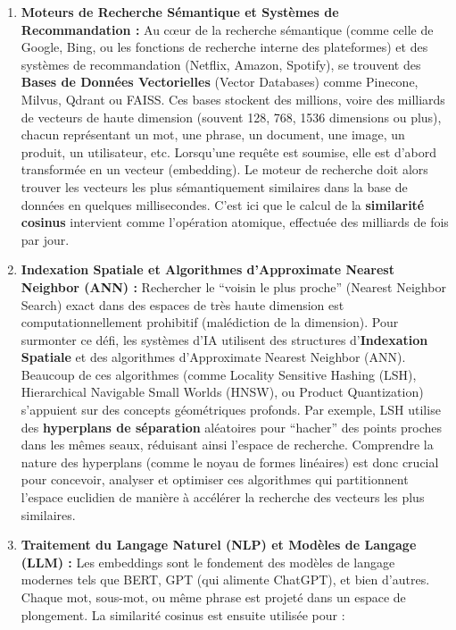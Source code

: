 \documentclass[11pt,a4paper]{report}
\begin{document}
\begin{itemize}
  \begin{enumerate}
  \def\labelenumi{\arabic{enumi}.}
  \item
    \textbf{Moteurs de Recherche Sémantique et Systèmes de
    Recommandation :} Au cœur de la recherche sémantique (comme celle de
    Google, Bing, ou les fonctions de recherche interne des plateformes)
    et des systèmes de recommandation (Netflix, Amazon, Spotify), se
    trouvent des \textbf{Bases de Données Vectorielles} (Vector
    Databases) comme Pinecone, Milvus, Qdrant ou FAISS. Ces bases
    stockent des millions, voire des milliards de vecteurs de haute
    dimension (souvent 128, 768, 1536 dimensions ou plus), chacun
    représentant un mot, une phrase, un document, une image, un produit,
    un utilisateur, etc. Lorsqu'une requête est soumise, elle est
    d'abord transformée en un vecteur (embedding). Le moteur de
    recherche doit alors trouver les vecteurs les plus sémantiquement
    similaires dans la base de données en quelques millisecondes. C'est
    ici que le calcul de la \textbf{similarité cosinus} intervient comme
    l'opération atomique, effectuée des milliards de fois par jour.
  \item
    \textbf{Indexation Spatiale et Algorithmes d'Approximate Nearest
    Neighbor (ANN) :} Rechercher le ``voisin le plus proche'' (Nearest
    Neighbor Search) exact dans des espaces de très haute dimension est
    computationnellement prohibitif (malédiction de la dimension). Pour
    surmonter ce défi, les systèmes d'IA utilisent des structures
    d'\textbf{Indexation Spatiale} et des algorithmes d'Approximate
    Nearest Neighbor (ANN). Beaucoup de ces algorithmes (comme Locality
    Sensitive Hashing (LSH), Hierarchical Navigable Small Worlds (HNSW),
    ou Product Quantization) s'appuient sur des concepts géométriques
    profonds. Par exemple, LSH utilise des \textbf{hyperplans de
    séparation} aléatoires pour ``hacher'' des points proches dans les
    mêmes seaux, réduisant ainsi l'espace de recherche. Comprendre la
    nature des hyperplans (comme le noyau de formes linéaires) est donc
    crucial pour concevoir, analyser et optimiser ces algorithmes qui
    partitionnent l'espace euclidien de manière à accélérer la recherche
    des vecteurs les plus similaires.
  \item
    \textbf{Traitement du Langage Naturel (NLP) et Modèles de Langage
    (LLM) :} Les embeddings sont le fondement des modèles de langage
    modernes tels que BERT, GPT (qui alimente ChatGPT), et bien
    d'autres. Chaque mot, sous-mot, ou même phrase est projeté dans un
    espace de plongement. La similarité cosinus est ensuite utilisée
    pour :


\end{enumerate}
\end{itemize}
\end{document}
